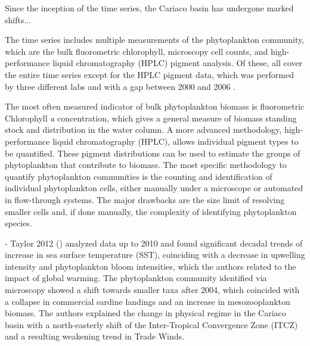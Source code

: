 \documentclass[draft]{agujournal2019}
\begin{document}
    



    
    
    Since the inception of the time series, the Cariaco basin has undergone marked shifts...

    The time series includes multiple measurements of the phytoplankton community, which are the bulk fluorometric chlorophyll, microscopy cell counts, and high-performance liquid chromatography (HPLC) pigment analysis. Of these, all cover the entire time series except for the HPLC pigment data, which was performed by three different labs and with a gap between 2000 and 2006 \cite{muller-karger_scientific_2019}. 

    The most often measured indicator of bulk phytoplankton biomass is fluorometric Chlorophyll \textit{a} concentration, which gives a general measure of biomass standing stock and distribution in the water column. A more advanced methodology, high-performance liquid chromatography (HPLC), allows individual pigment types to be quantified. These pigment distributions can be used to estimate the groups of phytoplankton that contribute to biomass. The most specific methodology to quantify phytoplankton communities is the counting and identification of individual phytoplankton cells, either manually under a microscope or automated in flow-through systems. The major drawbacks are the size limit of resolving smaller cells and, if done manually, the complexity of identifying phytoplankton species. 


    - Taylor 2012 ()
     analyzed data up to 2010 and found significant decadal trends of increase in sea surface temperature (SST), coinciding with a decrease in upwelling intensity and phytoplankton bloom intensities, which the authors related to the impact of global warming. The phytoplankton community identified via microscopy showed a shift towards smaller taxa after 2004, which coincided with a collapse in commercial sardine landings and an increase in mesozooplankton biomass. The authors explained the change in physical regime in the Cariaco basin with a north-easterly shift of the Inter-Tropical Convergence Zone (ITCZ) and a resulting weakening trend in Trade Winds.
    
\end{document}
